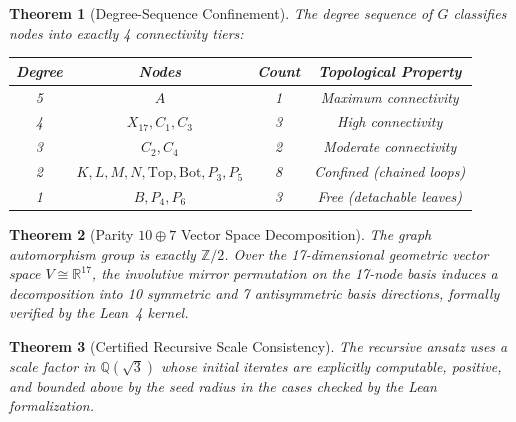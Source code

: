 \documentclass[12pt, a4paper]{article}
\newtheorem{theorem}{Theorem}
\begin{document}
\bigskip

\begin{theorem}[Degree-Sequence Confinement]
The degree sequence of $G$ classifies nodes into exactly 4 connectivity tiers:

\begin{center}
\begin{tabular}{@{}cccc@{}}
\toprule
\textbf{Degree} & \textbf{Nodes} & \textbf{Count} & \textbf{Topological Property} \\
\midrule
5 & $A$ & 1 & Maximum connectivity \\
4 & $X_{17}, C_1, C_3$ & 3 & High connectivity \\
3 & $C_2, C_4$ & 2 & Moderate connectivity \\
2 & $K,L,M,N,\text{Top},\text{Bot},P_3,P_5$ & 8 & Confined (chained loops) \\
1 & $B, P_4, P_6$ & 3 & Free (detachable leaves) \\
\bottomrule
\end{tabular}
\end{center}
\end{theorem}

\bigskip

\begin{theorem}[Parity $10 \oplus 7$ Vector Space Decomposition]
The graph automorphism group is exactly $\mathbb{Z}/2$. Over the 17-dimensional geometric vector space $V \cong \mathbb{R}^{17}$, the involutive mirror permutation on the 17-node basis induces a decomposition into 10 symmetric and 7 antisymmetric basis directions, formally verified by the Lean~4 kernel.
\end{theorem}

\bigskip

\begin{theorem}[Certified Recursive Scale Consistency]
The recursive ansatz uses a scale factor in $\mathbb{Q}(\sqrt{3})$ whose initial iterates are explicitly computable, positive, and bounded above by the seed radius in the cases checked by the Lean formalization.
\end{theorem}

\bigskip
\end{document}
